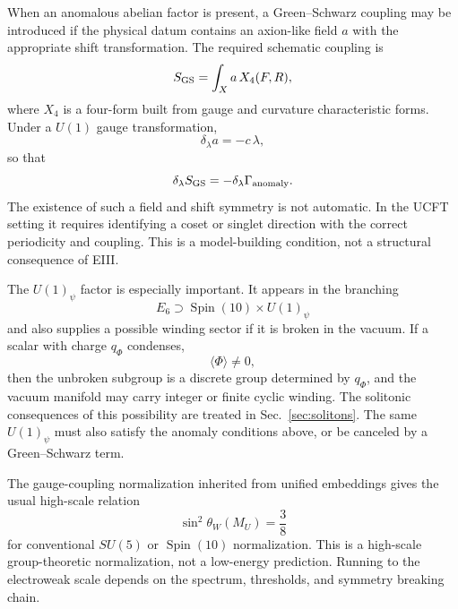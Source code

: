 \documentclass[aps,prd,preprint,longbibliography,nofootinbib,superscriptaddress,floatfix]{revtex4-2}
\newcommand{\Spin}{\operatorname{Spin}}
\begin{document}
When an anomalous abelian factor is present, a Green--Schwarz coupling may be
introduced if the physical datum contains an axion-like field \(a\) with the
appropriate shift transformation. The required schematic coupling is
\begin{equation}
    S_{\rm GS}
    =
    \int_X a\,X_4(F,R),
    \label{eq:matter_gs_coupling}
\end{equation}
where \(X_4\) is a four-form built from gauge and curvature characteristic
forms. Under a \(U(1)\) gauge transformation,
\begin{equation}
    \delta_\lambda a
    =
    -c\,\lambda ,
    \label{eq:matter_axion_shift}
\end{equation}
so that
\begin{equation}
    \delta_\lambda S_{\rm GS}
    =
    -\delta_\lambda\Gamma_{\rm anomaly}.
    \label{eq:matter_gs_cancellation}
\end{equation}
The existence of such a field and shift symmetry is not automatic. In the UCFT
setting it requires identifying a coset or singlet direction with the correct
periodicity and coupling. This is a model-building condition, not a structural
consequence of EIII.

The \(U(1)_\psi\) factor is especially important. It appears in the branching
\begin{equation}
    E_6
    \supset
    \Spin(10)\times U(1)_\psi
    \label{eq:matter_u1psi_again}
\end{equation}
and also supplies a possible winding sector if it is broken in the vacuum. If
a scalar with charge \(q_\Phi\) condenses,
\begin{equation}
    \langle \Phi\rangle\neq 0,
    \label{eq:matter_u1_condensate}
\end{equation}
then the unbroken subgroup is a discrete group determined by \(q_\Phi\), and
the vacuum manifold may carry integer or finite cyclic winding. The solitonic
consequences of this possibility are treated in Sec.~\ref{sec:solitons}. The
same \(U(1)_\psi\) must also satisfy the anomaly conditions above, or be
canceled by a Green--Schwarz term.

The gauge-coupling normalization inherited from unified embeddings gives the
usual high-scale relation
\begin{equation}
    \sin^2\theta_W(M_U)=\frac38
    \label{eq:matter_weinberg_angle}
\end{equation}
for conventional \(SU(5)\) or \(\Spin(10)\) normalization. This is a
high-scale group-theoretic normalization, not a low-energy prediction. Running
to the electroweak scale depends on the spectrum, thresholds, and symmetry
breaking chain.
\end{document}
